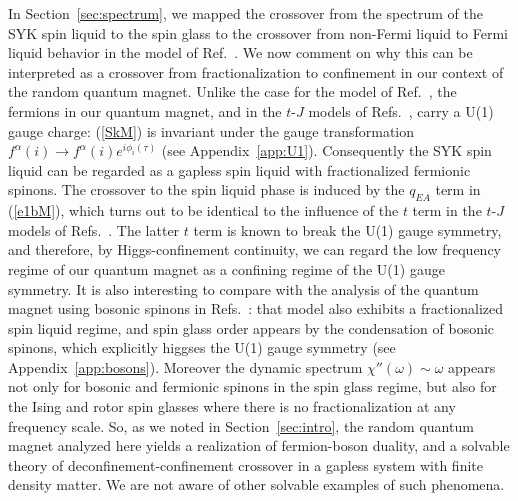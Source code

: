 \documentclass[aps,prx,preprint,onecolumn,citeautoscript,superscriptaddress,nofootinbib,
eqsecnum]{revtex4}
\begin{document}
{In Section~\ref{sec:spectrum}, we mapped the crossover from the spectrum of the SYK spin liquid to the spin glass to the crossover from non-Fermi liquid to Fermi liquid behavior in the model of Ref.~\cite{Balents2017}.
We now comment on why this can be interpreted as a crossover from fractionalization to confinement in our context of the random quantum magnet. Unlike the case for the model of Ref.~\cite{Balents2017}, the fermions in our quantum magnet, and in the $t$-$J$ models of Refs.~\cite{PG98,randomtJ1}, carry a U(1) gauge charge: (\ref{SkM}) is invariant under the gauge transformation $f^\alpha (i) \rightarrow f^\alpha (i) e^{i \phi_i (\tau)}$ (see Appendix~\ref{app:U1}). Consequently the SYK spin liquid can be regarded as a gapless spin liquid with fractionalized fermionic spinons. The crossover to the spin liquid phase is induced by the $q_{EA}$ term in (\ref{e1bM}), which turns out to be identical to the influence of the $t$ term in the $t$-$J$ models of Refs.~\cite{PG98,randomtJ1}. The latter $t$ term is known to break the U(1) gauge symmetry, and therefore, by Higgs-confinement continuity, we can regard the low frequency regime of our quantum magnet as a confining regime of the U(1) gauge symmetry. It is also interesting to compare with the analysis of the quantum magnet using bosonic spinons in Refs.~\cite{GPS00,GPS01}: that model also exhibits a fractionalized spin liquid regime, and spin glass order appears by the condensation of bosonic spinons, which explicitly higgses the U(1) gauge symmetry (see Appendix~\ref{app:bosons}). 
Moreover the dynamic spectrum $\chi'' (\omega) \sim \omega$ appears not only for bosonic and fermionic spinons in the spin glass regime, but also for the Ising and rotor spin glasses \cite{RSY95,Cugliandolo00,Anous:2021eqj} where there is no fractionalization at any frequency scale.
So, as we noted in Section~\ref{sec:intro}, the random quantum magnet analyzed here yields a realization of fermion-boson duality, and a solvable theory of deconfinement-confinement crossover in a gapless system with finite density matter. We are not aware of other solvable examples of such phenomena.


}
\end{document}
